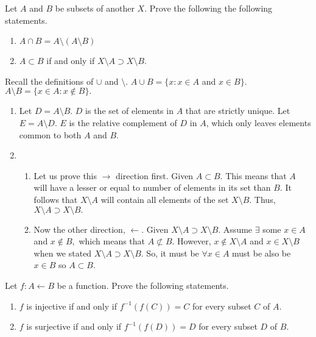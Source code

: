 \documentclass[12pt,letterpaper,boxed]{hmcpset}
\begin{document}

\begin{problem}[Exercise 1.7.]
Let $A$ and $B$ be subsets of another $X$. Prove the following the following statements. 
\vspace{-2mm}
\begin{enumerate}
	\itemsep0em
	\item $A \cap B = A \setminus(A\setminus B)$
	\item $A \subset B$ if and only if $X\setminus A \supset X\setminus B.$
\end{enumerate}
\end{problem}


\begin{solution}
Recall the definitions of $\cup$ and $\setminus$. $ A \cup B = \{x: x \in A$ and $x \in B\}$. $A\setminus B = \{ x \in A: x \notin B\}.$

\begin{enumerate}
	\itemsep0em
\item Let $D = A \setminus B.$ $D$ is the set of elements in $A$ that are strictly unique. Let $E = A \setminus D.$ $E$ is the relative complement of $D$ in $A$, which only leaves elements common to both $A$ and $B$. 
\item 

\begin{enumerate}
	\itemsep0em
	\item Let us prove this $\rightarrow$ direction first. Given $A \subset B.$ This means that $A$ will have a lesser or equal to number of elements in its set than $B.$ It follows that $X\setminus A$ will contain all elements of the set $X\setminus B.$ Thus, $X\setminus A \supset X\setminus B.$ 
	\item Now the other direction, $\leftarrow$. Given $X\setminus A \supset X\setminus B.$ Assume $\exists$ some $x \in A$ and $x \notin B,$ which means that $A \not\subset B$. However, $x \notin X\setminus A$ and $x \in X\setminus B$ when we stated $X\setminus A \supset X\setminus B.$ So, it must be $\forall x \in A$ must be also be $x \in B$ so $A \subset B$.
\end{enumerate}
\end{enumerate}
\end{solution}

\begin{problem}[Exercise 3.3.]
Let $f: A \leftarrow B$ be a function. Prove the following statements.
\vspace{-2mm}
\begin{enumerate}
	\itemsep0em
	\item $f$ is injective if and only if $f^{-1}(f(C)) = C$ for every subset $C$ of $A$.
	\item $f$ is surjective if and only if $f^{-1}(f(D)) = D$ for every subset $D$ of $B$.
\end{enumerate}
\end{problem}
\end{document}
